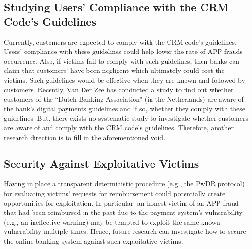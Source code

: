 \subsection{Studying Users' Compliance with the CRM Code's Guidelines}

Currently,   customers are expected to comply with the CRM code's guidelines.  Users'  compliance with these guidelines  could help lower the rate of APP frauds occurrence.  Also, if victims fail to comply with such  guidelines, then banks can claim that customers' have been negligent which ultimately could cost the victims. Such guidelines would be effective when they are known and followed by customers. Recently, Van Der Zee \cite{zee2021shifting}  has conducted a study to find out whether customers of the ``Dutch Banking Association" (in the Netherlands) are aware of the bank's digital payments guidelines and if so, whether they comply with these guidelines.  But, there exists no systematic study to  investigate whether  customers are aware of and comply with the CRM code's  guidelines. Therefore, another research direction is to fill in the aforementioned void. 



\subsection{Security Against Exploitative Victims}



Having in place a transparent deterministic procedure (e.g.,  the PwDR protocol)  for evaluating victims' requests for reimbursement  could potentially create opportunities for exploitation. In particular, an honest victim  of an APP fraud that had been reimbursed in the past due to the payment system's vulnerability (e.g., an  ineffective warning) may be tempted to  exploit the same  known vulnerability multiple times. Hence, future research can investigate how to secure the online banking system against such exploitative victims.











